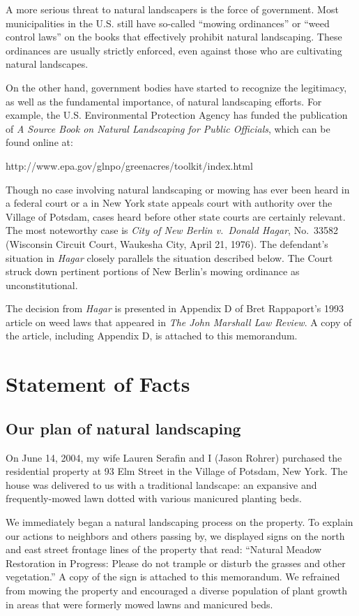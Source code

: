 \documentclass[12pt]{article}
\begin{document}
A more serious threat to natural landscapers is the force of government.
Most municipalities in the U.S. still have so-called ``mowing ordinances'' or ``weed control laws'' on the books that effectively prohibit natural landscaping.
These ordinances are usually strictly enforced, even against those who are cultivating natural landscapes.

On the other hand, government bodies have started to recognize the legitimacy, as well as the fundamental importance, of natural landscaping efforts.
For example, the U.S. Environmental Protection Agency has funded the publication of {\em  A Source Book on Natural Landscaping for Public Officials}, which can be found online at:
\begin{center}
http://www.epa.gov/glnpo/greenacres/toolkit/index.html
\end{center}

Though no case involving natural landscaping or mowing has ever been heard in a federal court or a in New York state appeals court with authority over the Village of Potsdam, cases heard before other state courts are certainly relevant.
The most noteworthy case is {\em City of New Berlin v.\ Donald Hagar}, No.\ 33582 (Wisconsin Circuit Court, Waukesha City, April 21, 1976).  
The defendant's situation in {\it Hagar} closely parallels the situation described below.
The Court struck down pertinent portions of New Berlin's mowing ordinance as unconstitutional.

The decision from {\it Hagar} is presented in Appendix D of Bret Rappaport's 1993 article on weed laws that appeared in {\em The John Marshall Law Review}.
A copy of the article, including Appendix D, is attached to this memorandum.


\section{Statement of Facts}

\subsection{Our plan of natural landscaping}
On June 14, 2004, my wife Lauren Serafin and I (Jason Rohrer) purchased the residential property at 93 Elm Street in the Village of Potsdam, New York.
The house was delivered to us with a traditional landscape:  an expansive and frequently-mowed lawn dotted with various manicured planting beds.

We immediately began a natural landscaping process on the property.
To explain our actions to neighbors and others passing by, we displayed signs on the north and east street frontage lines of the property that read:  ``Natural Meadow Restoration in Progress:  Please do not trample or disturb the grasses and other vegetation.''
A copy of the sign is attached to this memorandum.
We refrained from mowing the property and encouraged a diverse population of plant growth in areas that were formerly mowed lawns and manicured beds. 
\end{document}
